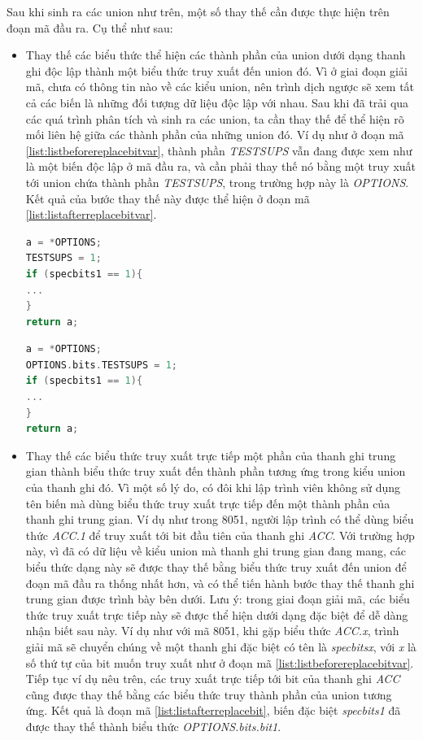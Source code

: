 Sau khi sinh ra các union như trên, một số thay thế cần được thực hiện trên đoạn mã đầu ra. Cụ thể như sau:
\begin{itemize}
\item Thay thế các biểu thức thể hiện các thành phần của union dưới dạng thanh ghi độc lập thành một biểu thức truy xuất đến union đó. Vì ở giai đoạn giải mã, chưa có thông tin nào về các kiểu union, nên trình dịch ngược sẽ xem tất cả các biến là những đối tượng dữ liệu độc lập với nhau. Sau khi đã trải qua các quá trình phân tích và sinh ra các union, ta cần thay thế để thể hiện rõ mối liên hệ giữa các thành phần của những union đó. Ví dụ như ở đoạn mã \ref{list:listbeforereplacebitvar}, thành phần \textit{TESTSUPS} vẫn đang được xem như là một biến độc lập ở mã đầu ra, và cần phải thay thế nó bằng một truy xuất tới union chứa thành phần \textit{TESTSUPS}, trong trường hợp này là \textit{OPTIONS}. Kết quả của bước thay thế này được thể hiện ở đoạn mã \ref{list:listafterreplacebitvar}.
\begin{lstlisting}[caption={Mã đầu ra trước khi thực hiện các bước thay thế},label={list:listbeforereplacebitvar}, language = c]
a = *OPTIONS;
TESTSUPS = 1;
if (specbits1 == 1){
...
}
return a;
\end{lstlisting}

\begin{lstlisting}[caption={Mã đầu ra sau khi thực hiện bước thay thế thành phần của union},label={list:listafterreplacebitvar}, language = c]
a = *OPTIONS;
OPTIONS.bits.TESTSUPS = 1;
if (specbits1 == 1){
...
}
return a;
\end{lstlisting}
\item Thay thế các biểu thức truy xuất trực tiếp một phần của thanh ghi trung gian thành biểu thức truy xuất đến thành phần tương ứng trong kiểu union của thanh ghi đó. Vì một số lý do, có đôi khi lập trình viên không sử dụng tên biến mà dùng biểu thức truy xuất trực tiếp đến một thành phần của thanh ghi trung gian. Ví dụ như trong 8051, người lập trình có thể dùng biểu thức \textit{ACC.1 }để truy xuất tới bit đầu tiên của thanh ghi \textit{ACC}. Với trường hợp này, vì đã có dữ liệu về kiểu union mà thanh ghi trung gian đang mang, các biểu thức dạng này sẽ được thay thế bằng biểu thức truy xuất đến union để đoạn mã đầu ra thống nhất hơn, và có thể tiến hành bước thay thế thanh ghi trung gian được trình bày bên dưới. Lưu ý: trong giai đoạn giải mã, các biểu thức truy xuất trực tiếp này sẽ được thể hiện dưới dạng đặc biệt để dễ dàng nhận biết sau này. Ví dụ như với mã 8051, khi gặp biểu thức \textit{ACC.x}, trình giải mã sẽ chuyển chúng về một thanh ghi đặc biệt có tên là \textit{specbitsx}, với \textit{x} là số thứ tự của bit muốn truy xuất như ở đoạn mã \ref{list:listbeforereplacebitvar}. Tiếp tục ví dụ nêu trên, các truy xuất trực tiếp tới bit của thanh ghi \textit{ACC} cũng được thay thế bằng các biểu thức truy thành phần của union tương ứng. Kết quả là đoạn mã \ref{list:listafterreplacebit}, biến đặc biệt \textit{specbits1} đã được thay thế thành biểu thức \textit{OPTIONS.bits.bit1}.


\end{itemize}
